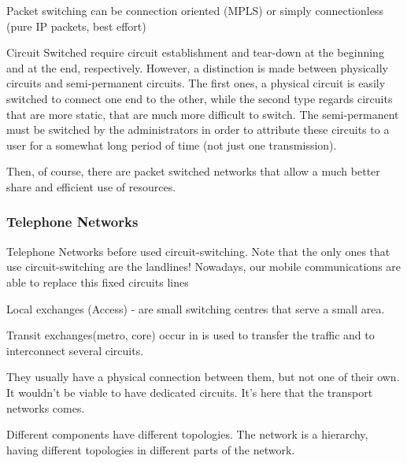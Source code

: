 Packet switching can be connection oriented (MPLS) or simply connectionless (pure IP packets, best effort)

Circuit Switched require circuit establishment and tear-down at the beginning and at the end, respectively. However, a distinction is made between physically  circuits and semi-permanent circuits. The first ones, a physical circuit is easily switched to connect one end to the other, while the second type regards circuits that are more static, that are much more difficult to switch. The semi-permanent must be switched by the administrators in order to attribute these circuits to a user for a somewhat long period of time (not just one transmission).



Then, of course, there are packet switched networks that allow a much better share and efficient use of resources.




\subsubsection*{Telephone Networks}
Telephone Networks before used circuit-switching. Note that the only ones that use circuit-switching are the landlines! Nowadays, our mobile communications are able to replace this fixed circuits lines

Local exchanges (Access) - are small switching centres that serve a small area.

Transit exchanges(metro, core) occur in  is used to transfer the traffic and to interconnect several circuits.

They usually have a physical connection between them, but not one of their own. It wouldn't be viable to have dedicated circuits. It's here that the transport networks comes.

Different components have different topologies. The network is a hierarchy, having different topologies in different parts of the network.

